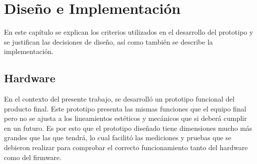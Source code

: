 \chapter{Diseño e Implementación} %

\label{Chapter3} %


En este capítulo se explican los criterios utilizados en el desarrollo del prototipo y se justifican las decisiones de diseño, así como también se describe la implementación.

\section{Hardware}
\label{section:hardware}

En el contexto del presente trabajo, se desarrolló un prototipo funcional del producto final. Este prototipo presenta las mismas funciones que el equipo final pero no se ajusta a los lineamientos estéticos y mecánicos que si deberá cumplir en un futuro. Es por esto que el prototipo diseñado tiene dimensiones mucho más grandes que las que tendrá, lo cual facilitó las mediciones y pruebas que se debieron realizar para comprobar el correcto funcionamiento tanto del hardware como del firmware. 

